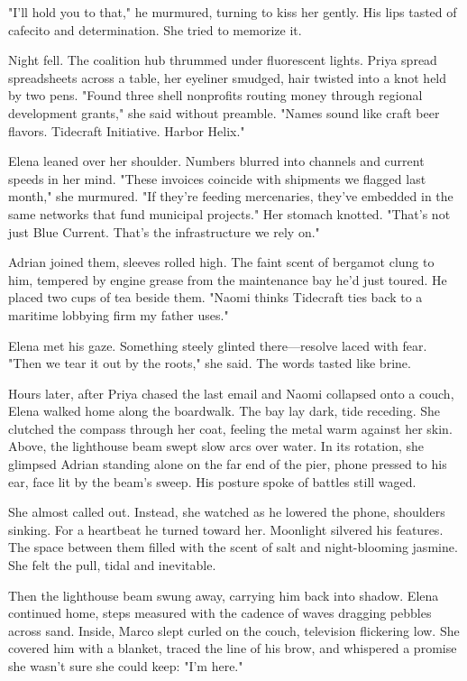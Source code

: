 "I'll hold you to that," he murmured, turning to kiss her gently. His lips tasted of cafecito and determination. She tried to memorize it.

Night fell. The coalition hub thrummed under fluorescent lights. Priya spread spreadsheets across a table, her eyeliner smudged, hair twisted into a knot held by two pens. "Found three shell nonprofits routing money through regional development grants," she said without preamble. "Names sound like craft beer flavors. Tidecraft Initiative. Harbor Helix."

Elena leaned over her shoulder. Numbers blurred into channels and current speeds in her mind. "These invoices coincide with shipments we flagged last month," she murmured. "If they're feeding mercenaries, they've embedded in the same networks that fund municipal projects." Her stomach knotted. "That's not just Blue Current. That's the infrastructure we rely on."

Adrian joined them, sleeves rolled high. The faint scent of bergamot clung to him, tempered by engine grease from the maintenance bay he'd just toured. He placed two cups of tea beside them. "Naomi thinks Tidecraft ties back to a maritime lobbying firm my father uses."

Elena met his gaze. Something steely glinted there—resolve laced with fear. "Then we tear it out by the roots," she said. The words tasted like brine.

Hours later, after Priya chased the last email and Naomi collapsed onto a couch, Elena walked home along the boardwalk. The bay lay dark, tide receding. She clutched the compass through her coat, feeling the metal warm against her skin. Above, the lighthouse beam swept slow arcs over water. In its rotation, she glimpsed Adrian standing alone on the far end of the pier, phone pressed to his ear, face lit by the beam's sweep. His posture spoke of battles still waged.

She almost called out. Instead, she watched as he lowered the phone, shoulders sinking. For a heartbeat he turned toward her. Moonlight silvered his features. The space between them filled with the scent of salt and night-blooming jasmine. She felt the pull, tidal and inevitable.

Then the lighthouse beam swung away, carrying him back into shadow. Elena continued home, steps measured with the cadence of waves dragging pebbles across sand. Inside, Marco slept curled on the couch, television flickering low. She covered him with a blanket, traced the line of his brow, and whispered a promise she wasn't sure she could keep: "I'm here."

